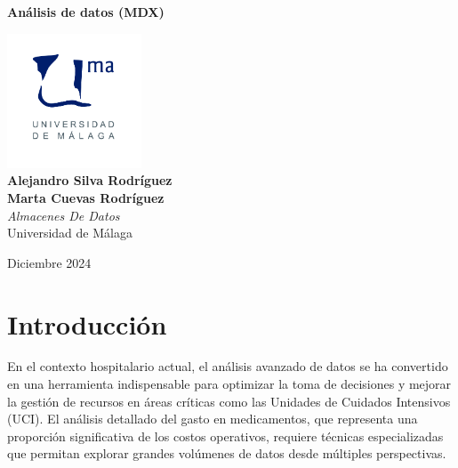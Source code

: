 \documentclass{article}
\begin{document}
	
	
	
	\begin{titlepage}
		\centering
		\vspace*{3cm}
		
		{\Huge \textbf{Análisis de datos (MDX)}\\[0.5cm]}
		
		\vspace{2cm}
		\includegraphics[width=0.3\textwidth]{images/uma_logo.jpg}\\[1cm]
		
		{\LARGE \textbf{Alejandro Silva Rodríguez}\\[0.5cm]}
		{\LARGE \textbf{Marta Cuevas Rodríguez}\\[0.5cm]}
		{\large \textit{Almacenes De Datos}\\
			Universidad de Málaga\\
		}
		
		\vfill
		
		{\large Diciembre 2024}
	\end{titlepage}
	
	\tableofcontents
	
	\newpage
\section{Introducción}
\label{sec:introduccion}

En el contexto hospitalario actual, el análisis avanzado de datos se ha convertido en una herramienta indispensable para optimizar la toma de decisiones y mejorar la gestión de recursos en áreas críticas como las Unidades de Cuidados Intensivos (UCI). El análisis detallado del gasto en medicamentos, que representa una proporción significativa de los costos operativos, requiere técnicas especializadas que permitan explorar grandes volúmenes de datos desde múltiples perspectivas.\\
\end{document}
